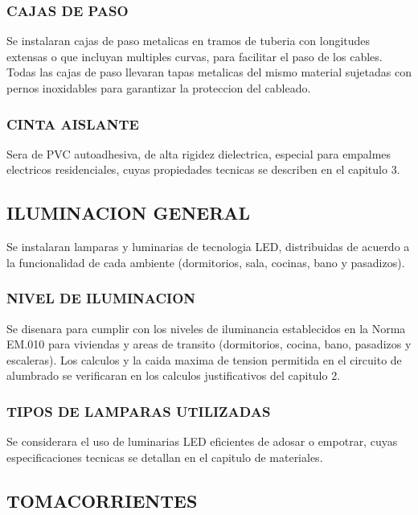 \subsubsection{CAJAS DE PASO}

Se instalaran cajas de paso metalicas en tramos de tuberia con longitudes extensas o que incluyan multiples curvas, para facilitar el paso de los cables. Todas las cajas de paso llevaran tapas metalicas del mismo material sujetadas con pernos inoxidables para garantizar la proteccion del cableado.

\subsubsection{CINTA AISLANTE}

Sera de PVC autoadhesiva, de alta rigidez dielectrica, especial para empalmes electricos residenciales, cuyas propiedades tecnicas se describen en el capitulo 3.

\subsection{ILUMINACION GENERAL}

Se instalaran lamparas y luminarias de tecnologia LED, distribuidas de acuerdo a la funcionalidad de cada ambiente (dormitorios, sala, cocinas, bano y pasadizos).

\subsubsection{NIVEL DE ILUMINACION}

Se disenara para cumplir con los niveles de iluminancia establecidos en la Norma EM.010 para viviendas y areas de transito (dormitorios, cocina, bano, pasadizos y escaleras). Los calculos y la caida maxima de tension permitida en el circuito de alumbrado se verificaran en los calculos justificativos del capitulo 2.

\subsubsection{TIPOS DE LAMPARAS UTILIZADAS}

Se considerara el uso de luminarias LED eficientes de adosar o empotrar, cuyas especificaciones tecnicas se detallan en el capitulo de materiales.

\subsection{TOMACORRIENTES}

